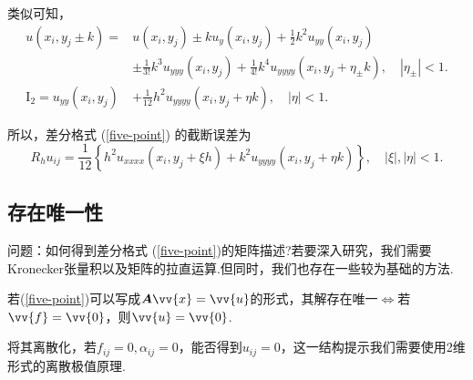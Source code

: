 类似可知，
\begin{align*}
    u(x_i, y_j \pm k) =& u(x_i, y_j) \pm k u_y(x_i, y_j) + \frac{1}{2}k^2 u_{yy}(x_i, y_j) \\
    &\pm \frac{1}{3!}k^3 u_{yyy}(x_i, y_j) + \frac{1}{4!}k^4 u_{yyyy}(x_i, y_j + \eta_{\pm} k), \quad |\eta_{\pm}| < 1.\\
    \mathrm{I}_2 = u_{yy}(x_i, y_j) &+ \frac{1}{12}h^2 u_{yyyy}(x_i, y_j + \eta k), \quad |\eta| < 1. 
\end{align*}

所以，差分格式 (\ref{five-point}) 的截断误差为
\begin{equation}
    R_h u_{ij} = \frac{1}{12} \left\{ h^2 u_{xxxx}(x_i, y_j + \xi h) + k^2 u_{yyyy}(x_i, y_j + \eta k) \right\}, \quad |\xi|, |\eta| < 1. 
\end{equation}

\subsection{存在唯一性}
问题：如何得到差分格式 (\ref{five-point})的矩阵描述?若要深入研究，我们需要Kronecker张量积以及矩阵的拉直运算.但同时，我们也存在一些较为基础的方法.\par
若(\ref{five-point})可以写成$\bm{A}\vv{x}=\vv{u}$的形式，其解存在唯一$\iff$若$\vv{f}=\vv{0}$，则$\vv{u}=\vv{0}$.\par
将其离散化，若$f_{ij}=0,\alpha_{ij}=0$，能否得到$u_{ij}=0$，这一结构提示我们需要使用2维形式的离散极值原理.

